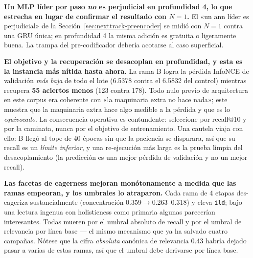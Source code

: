 \documentclass[11pt]{article}
\begin{document}
\textbf{Un MLP líder por paso \emph{no} es perjudicial en profundidad 4, lo que
estrecha en lugar de confirmar el resultado con $N=1$.} El «un ann líder es
perjudicial» de la Sección~\ref{sec:nexttrack-preencoder} se midió con $N=1$ contra una GRU
única; en profundidad 4 la misma adición es gratuita o ligeramente buena. La trampa
del pre-codificador debería acotarse al caso superficial.

\textbf{El objetivo y la recuperación se desacoplan en profundidad, y esta es la
instancia más nítida hasta ahora.} La rama B logra la pérdida InfoNCE de validación
\emph{más baja} de todo el lote (\num{6.5378} contra el \num{6.5832} del control)
mientras recupera \textbf{\num{55} aciertos menos} (\num{123} contra \num{178}).
Todo nulo previo de arquitectura en este corpus era coherente con «la maquinaria
extra no hace nada»; este muestra que la maquinaria extra hace algo medible a la
pérdida y que es lo \emph{equivocado}. La consecuencia operativa es contundente:
seleccione por recall@10 y por la caminata, nunca por el objetivo de entrenamiento.
Una cautela viaja con ello: B llegó al tope de \num{40} épocas sin que la paciencia
se disparara, así que su recall es un \emph{límite inferior}, y una re-ejecución más
larga es la prueba limpia del desacoplamiento (la predicción es una mejor pérdida de
validación y no un mejor recall).

\textbf{Las facetas de eagerness mejoran monótonamente a medida que las ramas
empeoran, y los umbrales lo atraparon.} Cada rama de 4 etapas des-eageriza
sustancialmente (concentración \num{0.359}$\to$\numrange{0.263}{0.318}) y eleva
\texttt{ild}; bajo una lectura ingenua con holisticness como primaria algunas
parecerían interesantes. Todas mueren por el umbral absoluto de recall y por el
umbral de relevancia por línea base --- el mismo mecanismo que ya ha salvado cuatro
campañas. Nótese que la cifra \emph{absoluta} canónica de relevancia \num{0.43}
habría dejado pasar a varias de estas ramas, así que el umbral debe derivarse por
línea base.
\end{document}
